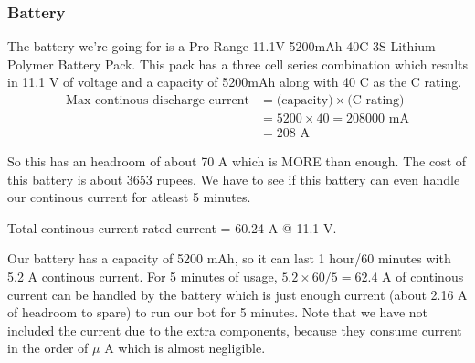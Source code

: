 \documentclass[12pt]{article}
\begin{document}
\subsubsection*{Battery}
The battery we're going for is a Pro-Range 11.1V 5200mAh 40C 3S Lithium Polymer Battery Pack. 
\newline
This pack has a three cell series combination which results in 11.1 V of voltage and a capacity of 5200mAh along with 40 C as the C rating.
\begin{align*}
    \text{Max continous discharge current} &= \text{(capacity)}\times\text{(C rating)}\\
    &= 5200 \times 40 = 208000\text{ mA}\\
    &= 208\text{ A}
\end{align*}

So this has an headroom of about 70 A which is MORE than enough. The cost of this battery is about 3653 rupees.
\newline
We have to see if this battery can even handle our continous current for atleast 5 minutes.

\begin{table}[!ht]
\centering
{}%
\caption{Continous Power and Current Requirements}
\end{table}
\FloatBarrier

Total continous current rated current = 60.24 A @ 11.1 V.

Our battery has a capacity of 5200 mAh, so it can last 1 hour/60 minutes with 5.2 A continous current. For 5 minutes of usage, $5.2 \times 60/ 5 = 62.4$ A of continous current can be handled by the battery which is just enough current (about 2.16 A of headroom to spare) to run our bot for 5 minutes.
\newline\newline
Note that we have not included the current due to the extra components, because they consume current in the order of $\mu$ A which is almost negligible.
\end{document}
